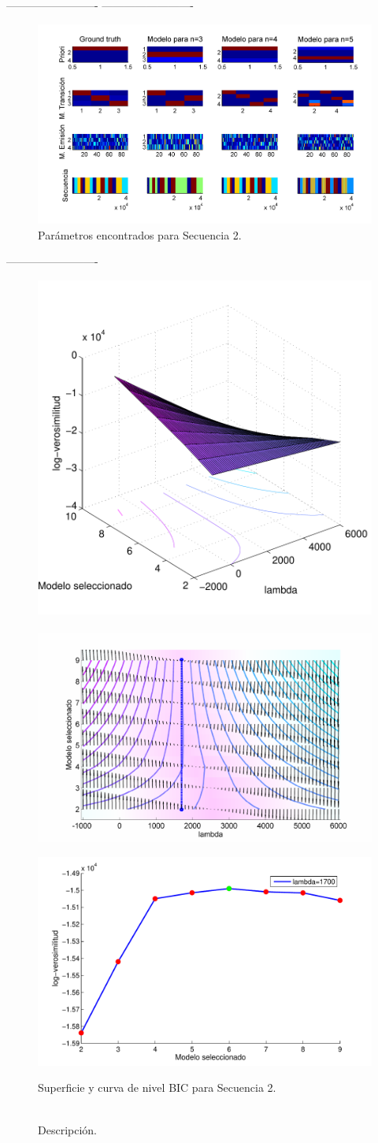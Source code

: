 -------------------------
-------------------------

\begin{figure}[H]
  \centerline
  {\includegraphics[width=1.3\linewidth]{gfx/chap6/soledad1}} \quad
  \caption{Parámetros encontrados para Secuencia 2.}
  \label{fig:prb1_par}
\end{figure}

-------------------------

\begin{figure}[H]
  \centerline  
  {\includegraphics[width=0.55\linewidth]{gfx/chap6/soledadbic1} ~
   \includegraphics[width=0.5\linewidth]{gfx/chap6/soledadbic2} }
  \centerline  
  {\includegraphics[width=0.4\linewidth]{gfx/chap6/soledadbic3}
  } \quad
  \caption{Superficie y curva de nivel BIC para Secuencia 2.}
  \caption*{\\Descripción.}
  \label{fig:prb1_sup}
\end{figure}

